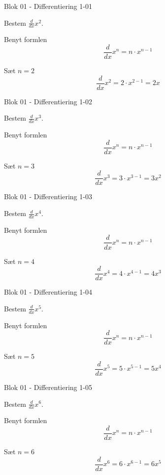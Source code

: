 \documentclass{article}
\begin{document}

\tableofcontents
\newpage

\begin{exercise}{Blok 01 - Differentiering 1-01}

Bestem $\frac{d}{dx} x^2$.


\hint

Benyt formlen
\[
\frac{d}{dx} x^n = n \cdot x^{n - 1}
\]

\hint

Sæt $n = 2$
\[
\frac{d}{dx} x^2 = 2 \cdot x^{2 - 1} = 2 x
\]
\end{exercise}

\begin{exercise}{Blok 01 - Differentiering 1-02}

Bestem $\frac{d}{dx} x^3$.


\hint

Benyt formlen
\[
\frac{d}{dx} x^n = n \cdot x^{n - 1}
\]

\hint

Sæt $n = 3$
\[
\frac{d}{dx} x^3 = 3 \cdot x^{3 - 1} = 3 x^2
\]
\end{exercise}

\begin{exercise}{Blok 01 - Differentiering 1-03}

Bestem $\frac{d}{dx} x^4$.


\hint

Benyt formlen
\[
\frac{d}{dx} x^n = n \cdot x^{n - 1}
\]

\hint

Sæt $n = 4$
\[
\frac{d}{dx} x^4 = 4 \cdot x^{4 - 1} = 4 x^3
\]
\end{exercise}

\begin{exercise}{Blok 01 - Differentiering 1-04}

Bestem $\frac{d}{dx} x^5$.


\hint

Benyt formlen
\[
\frac{d}{dx} x^n = n \cdot x^{n - 1}
\]

\hint

Sæt $n = 5$
\[
\frac{d}{dx} x^5 = 5 \cdot x^{5 - 1} = 5 x^4
\]
\end{exercise}

\begin{exercise}{Blok 01 - Differentiering 1-05}

Bestem $\frac{d}{dx} x^6$.


\hint

Benyt formlen
\[
\frac{d}{dx} x^n = n \cdot x^{n - 1}
\]

\hint

Sæt $n = 6$
\[
\frac{d}{dx} x^6 = 6 \cdot x^{6 - 1} = 6 x^5
\]
\end{exercise}
\end{document}
